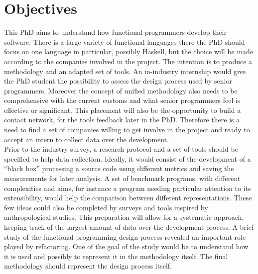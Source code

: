 \documentclass[12p]{article}
\begin{document}
\section*{Objectives}
This PhD aims to understand how functional programmers develop their
software. There is a large variety of functional languages there the
PhD should focus on one language in particular, possibly Haskell, but
the choice will be made according to the companies involved in the
project. The intention is to produce a methodology and an adapted set
of tools. An in-industry internship would give the PhD student the
possibility to assess the design process used by senior
programmers. Moreover the concept of unified methodology also needs to
be comprehensive with the current customs and what senior programmers
feel is effective or significant. This placement will also be the
opportunity to build a contact network, for the tools feedback later
in the PhD. Therefore there is a need to find a set of companies
willing to get involve in the project and ready to accept an intern to
collect data over the development.\\Prior to the industry survey, a
research protocol and a set of tools should be specified to help data
collection. Ideally, it would consist of the development of a ``black
box'' processing a source code using different metrics and saving the
measurements for later analysis. A set of benchmark programs, with
different complexities and aims, for instance a program needing
particular attention to its extensibility, would help the comparison
between different representations. These few ideas could also be
completed by surveys and tools inspired by anthropological
studies. This preparation will allow for a systematic approach,
keeping track of the largest amount of data over the development
process. A brief study of the functional programming design process
revealed an important role played by refactoring. One of the goal of
the study would be to understand how it is used and possibly to
represent it in the methodology itself. The final methodology should
represent the design process itself.\\
\end{document}
